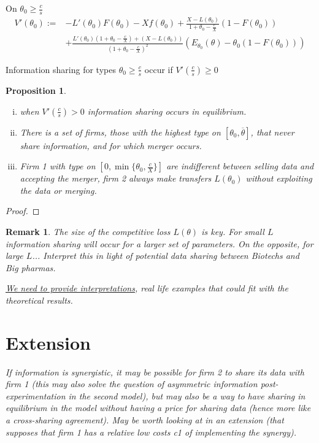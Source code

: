 \documentclass[a4paper]{article}
\newtheorem{prop}{Proposition}
\newtheorem{remark}{Remark}
\renewcommand{\t}{\theta}
\begin{document}
\medskip

On $\t_0\geq\frac{c}{s}$
\begin{equation}
\begin{aligned}
  V'(\t_0):=&-L'(\t_0)F(\t_0)-X f(\t_0)+\frac{X-L(\t_0)}{1+\t_0-\frac{c}{X}}(1-F(\t_0))\\
  &+\frac{L'(\t_0)(1+\t_0-\frac{c}{X})+(X-L(\t_0))}{(1+\t_0-\frac{c}{X})^2}(E_{\t_0}(\t)-\t_0(1-F(\t_0)))
\end{aligned}
\end{equation}



Information sharing for types $\t_0\geq \frac{c}{s}$ occur if $V'(\frac{c}{s})\geq 0$

\begin{prop}~~
  \begin{enumerate}[(i)]\setlength\itemsep{0em}
    \item when $V'(\frac{c}{s})>0$ information sharing occurs in equilibrium.
    \item There is a set of firms, those with the highest type on $[\t_0,\overline \t]$, that never share information, and for which merger occurs.
    \item Firm 1 with type on $[0,\min\{\t_0,\frac{c}{X}\}]$ are indifferent between selling data and accepting the merger, firm 2 always make transfers $L(\t_0)$ without exploiting the data or merging.
  \end{enumerate}
\end{prop}

\begin{proof}

\end{proof}

\begin{remark}
  The size of the competitive loss $L(\t)$ is key. For small $L$ information sharing will occur for a larger set of parameters. On the opposite, for large $L$... Interpret this in light of potential data sharing between Biotechs and Big pharmas.

  \underline{We need to provide interpretations}, real life examples that could fit with the theoretical results. 
  \end{remark}
  
  
\section{Extension}

\textit{If information is synergistic, it may be possible for firm 2 to share its data with firm 1 (this may also solve the question of asymmetric information post-experimentation in the second model), but may also be a way to have sharing in equilibrium in the model without having a price for sharing data (hence more like a cross-sharing agreement). May be worth looking at in an extension (that supposes that firm 1 has a relative low costs c1 of implementing the synergy).}
\end{document}
